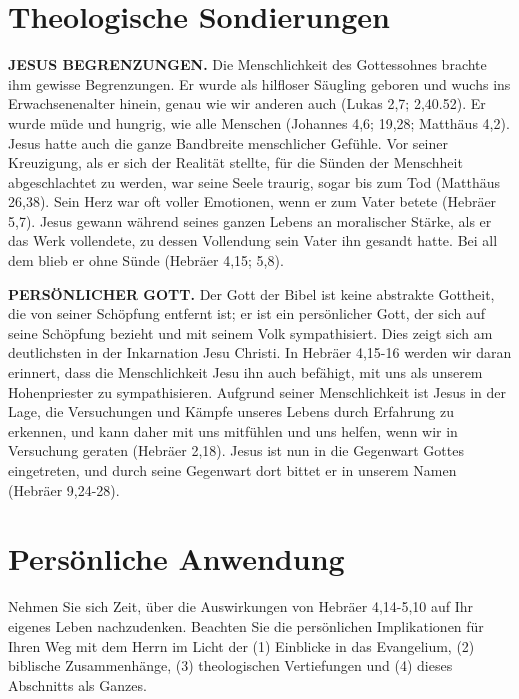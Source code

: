 \documentclass[
  12pt,
]{krantz}
\begin{document}
\hypertarget{theologische-sondierungen}{%
\section{Theologische Sondierungen}\label{theologische-sondierungen}}

\textbf{JESUS BEGRENZUNGEN.} Die Menschlichkeit des Gottessohnes brachte ihm gewisse Begrenzungen. Er wurde als hilfloser Säugling geboren und wuchs ins Erwachsenenalter hinein, genau wie wir anderen auch (Lukas 2,7; 2,40.52). Er wurde müde und hungrig, wie alle Menschen (Johannes 4,6; 19,28; Matthäus 4,2). Jesus hatte auch die ganze Bandbreite menschlicher Gefühle. Vor seiner Kreuzigung, als er sich der Realität stellte, für die Sünden der Menschheit abgeschlachtet zu werden, war seine Seele traurig, sogar bis zum Tod (Matthäus 26,38). Sein Herz war oft voller Emotionen, wenn er zum Vater betete (Hebräer 5,7). Jesus gewann während seines ganzen Lebens an moralischer Stärke, als er das Werk vollendete, zu dessen Vollendung sein Vater ihn gesandt hatte. Bei all dem blieb er ohne Sünde (Hebräer 4,15; 5,8).

\textbf{PERSÖNLICHER GOTT.} Der Gott der Bibel ist keine abstrakte Gottheit, die von seiner Schöpfung entfernt ist; er ist ein persönlicher Gott, der sich auf seine Schöpfung bezieht und mit seinem Volk sympathisiert. Dies zeigt sich am deutlichsten in der Inkarnation Jesu Christi. In Hebräer 4,15-16 werden wir daran erinnert, dass die Menschlichkeit Jesu ihn auch befähigt, mit uns als unserem Hohenpriester zu sympathisieren. Aufgrund seiner Menschlichkeit ist Jesus in der Lage, die Versuchungen und Kämpfe unseres Lebens durch Erfahrung zu erkennen, und kann daher mit uns mitfühlen und uns helfen, wenn wir in Versuchung geraten (Hebräer 2,18). Jesus ist nun in die Gegenwart Gottes eingetreten, und durch seine Gegenwart dort bittet er in unserem Namen (Hebräer 9,24-28).

\hypertarget{persuxf6nliche-anwendung}{%
\section{Persönliche Anwendung}\label{persuxf6nliche-anwendung}}

Nehmen Sie sich Zeit, über die Auswirkungen von Hebräer 4,14-5,10 auf Ihr eigenes Leben nachzudenken. Beachten Sie die persönlichen Implikationen für Ihren Weg mit dem Herrn im Licht der (1) Einblicke in das Evangelium, (2) biblische Zusammenhänge, (3) theologischen Vertiefungen und (4) dieses Abschnitts als Ganzes.
\end{document}
